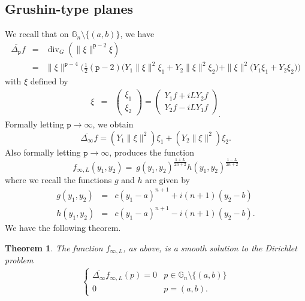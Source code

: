 \documentclass[12pt]{amsart}
\theoremstyle{plain}
\newtheorem{theorem}{Theorem}[section]
\theoremstyle{definition}
\numberwithin{equation}{section}
\begin{document}
\subsection{Grushin-type planes}
We recall that on $\mathbb{G}_n\setminus\{(a,b)\}$, we have
\begin{eqnarray*}
\overline{\Delta_{\texttt{p}}}f & = & {\operatorname{div}}_G(\|\xi\|^{{\texttt{p}}-2}\xi) \\
 & = &  \| \xi \|^{{\texttt{p}}-4}\Bigg(\frac{1}{2}({\texttt{p}}-2)\big(Y_1\| \xi  \|^{2} \xi _1+Y_2\| \xi \|^{2} \xi _2\big) +\| \xi \|^{2}\big(Y_1 \xi _1+Y_2 \xi _2\big)\Bigg)  
\end{eqnarray*}
with $\xi$ defined by
\begin{eqnarray*}
 \xi  & = & \left( \begin{array}{c}
 \xi _1\\
 \xi _2
\end{array} \right)
= \left( \begin{array}{c}
Y_1f+iLY_2f\\
Y_2f-iLY_1f
\end{array} \right)_.
\end{eqnarray*}
Formally letting ${\texttt{p}} \to \infty$, we obtain 
\begin{equation*}
\overline{\Delta_{\infty}}f = (Y_1\| \xi  \|^{2} )\xi _1+(Y_2\| \xi \|^{2}) \xi _2.
\end{equation*}
Also formally letting ${\texttt{p}} \to \infty$, produces the function 
\begin{equation*}
f_{\infty,L}(y_1,y_2) =\
g(y_1,y_2)^{\frac{1+L}{2n+2}}h(y_1,y_2)^{\frac{1-L}{2n+2}}
\end{equation*}
where we recall the functions $g$ and $h$ are given by
\begin{eqnarray*}
g(y_1,y_2) & = & c(y_1-a)^{n+1}+i(n+1)(y_2-b)\\ 
h(y_1,y_2) & = & c(y_1-a)^{n+1}-i(n+1)(y_2-b).
\end{eqnarray*}
We have the following theorem.
\begin{theorem}
The function $f_{\infty,L}$, as above, is a smooth solution to the Dirichlet problem
\begin{eqnarray*}
\left\{\begin{array}{cc}
\overline{\Delta_{\infty}}f_{\infty,L}(p)=0 & p \in \mathbb{G}_n\setminus\{(a,b)\} \\
0 & p = (a,b).
\end{array}\right.
\end{eqnarray*}
\end{theorem}
\end{document}

